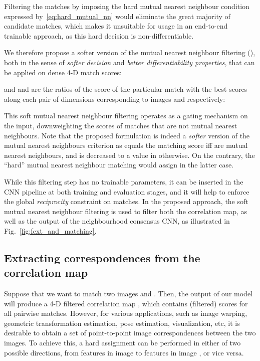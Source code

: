 \documentclass{article}
\begin{document}
Filtering the matches by imposing the hard mutual nearest neighbour condition expressed by~\eqref{eq:hard_mutual_nn} would eliminate the great majority of candidate matches, which makes it unsuitable for usage in an end-to-end trainable approach, as this hard decision is non-differentiable.

We therefore propose a softer version of the mutual nearest neighbour filtering (), both in the sense of \emph{softer decision} and \emph{better differentiability properties}, that can be applied on dense 4-D match scores:

and  and  are the ratios of the score of the particular match  with the best scores along each pair of dimensions corresponding to images  and  respectively:

This soft mutual nearest neighbour filtering operates as a gating mechanism on the input, downweighting the scores of matches that are not mutual nearest neighbours. Note that the proposed formulation is indeed a \emph{softer} version of the mutual nearest neighbours criterion as  equals the matching score  iff  are mutual nearest neighbours, and is decreased to a value in  otherwise. On the contrary, the ``hard'' mutual nearest neighbour matching would assign  in the latter case.


While this filtering step has no trainable parameters, it can be inserted in the CNN pipeline at both training and evaluation stages, and it will help to enforce the global \emph{reciprocity} constraint on matches. In the proposed approach, the soft mutual nearest neighbour filtering is used to filter both the correlation map, as well as the output of the neighbourhood consensus CNN, as illustrated in Fig.~\ref{fig:fext_and_matching}.  

\subsection{Extracting correspondences from the correlation map \label{sec:match_assignment}}
Suppose that we want to match two images  and . Then, the output of our model will produce a 4-D filtered correlation map , which contains (filtered) scores for all pairwise matches. However, for various applications, such as image warping, geometric transformation estimation, pose estimation, visualization, etc, it is desirable to obtain a set of point-to-point image correspondences between the two images. 
To achieve this, a hard assignment can be performed in either of two possible directions, from features in image  to features in image , or vice versa.
\end{document}
